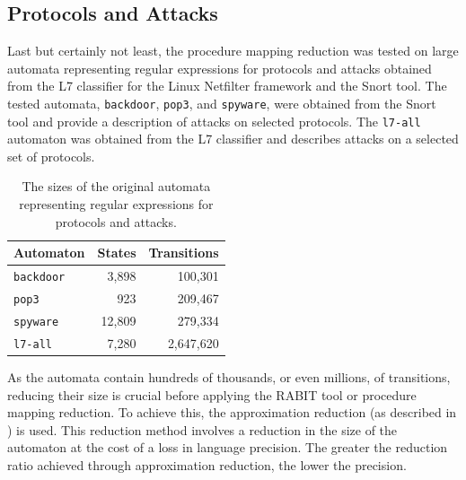     \subsection{Protocols and Attacks}
        Last but certainly not least, the procedure mapping reduction was tested on large automata representing regular expressions for protocols and attacks obtained from the L7 classifier for the Linux Netfilter framework and the Snort tool. The tested automata, \texttt{backdoor}, \texttt{pop3}, and \texttt{spyware}, were obtained from the Snort tool and provide a description of attacks on selected protocols. The \texttt{l7-all} automaton was obtained from the L7 classifier and describes attacks on a selected set of protocols.

        \begin{table}[!h]
            \centering
            \captionsetup{justification=justified}
            \footnotesize
            \begin{tabular}{|l||r|r|}
                \hline
                Automaton        	& States & Transitions\\[0.5ex]
                \hline
                \texttt{backdoor}   & 3,898  & 100,301 \\[0.5ex]
                \texttt{pop3}   	& 923	& 209,467 \\[0.5ex]
                \texttt{spyware}	& 12,809 & 279,334 \\[0.5ex]
                \texttt{l7-all}  	&7,280   &2,647,620 \\[0.5ex]
                \hline
            \end{tabular}
            \normalsize
            \caption{The sizes of the original automata representing regular expressions for protocols and attacks.}
        \end{table}

        As the automata contain hundreds of thousands, or even millions, of transitions, reducing their size is crucial before applying the RABIT tool or procedure mapping reduction. To achieve this, the approximation reduction (as described in \cite{ApproxRed}) is used. This reduction method involves a reduction in the size of the automaton at the cost of a loss in language precision. The greater the reduction ratio achieved through approximation reduction, the lower the precision.


